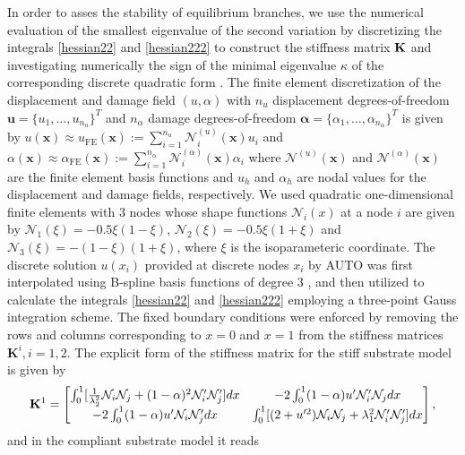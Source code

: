 In order to asses the stability of equilibrium branches, we use  the numerical evaluation of the smallest eigenvalue of the second variation by discretizing the integrals \eqref{hessian22} and   \eqref{hessian222} to construct the stiffness matrix
${\bf K}$ and investigating numerically the sign of the minimal eigenvalue $\kappa$ of the corresponding discrete quadratic form \cite{Sanderson2016-ht}.  The finite element discretization of the displacement and damage field $(u, \alpha )$     with \( n_u \) displacement degrees-of-freedom 
$
\mathbf{u} = \{ u_1, \ldots, u_{n_u} \}^T 
$
and \( n_\alpha \) damage degrees-of-freedom 
$
\boldsymbol{\alpha} = \{ \alpha_1, \ldots, \alpha_{n_\alpha} \}^T
$ is given by 
$
u(\mathbf{x}) \approx u_{\text{FE}} (\mathbf{x}) := \sum_{i=1}^{n_u} \mathcal{N}^{(u)}_i(\mathbf{x}) u_i $
and $\alpha(\mathbf{x}) \approx \alpha_{\text{FE}} (\mathbf{x}) := \sum_{i=1}^{n_\alpha} \mathcal{N}^{(\alpha)}_i (\mathbf{x}) \alpha_i 
$
where $\mathcal{N}^{(u)}(\mathbf{x}) $ and $\mathcal{N}^{(\alpha)}(\mathbf{x}) $ are the finite element basis functions and  $u_h$ and  $\alpha_h$ are nodal values for the displacement and damage fields, respectively. We used quadratic one-dimensional finite elements with 3 nodes  whose   shape functions   ${\mathcal N}_i(x)$ at a node $i$  are given by ${\mathcal N}_1(\xi)=-0.5\xi(1-\xi)$, ${\mathcal N}_2(\xi)=-0.5\xi(1+\xi)$ and ${\mathcal N}_3(\xi)=-(1-\xi)(1+\xi)$, where $\xi$ is the isoparameteric coordinate. The discrete solution $u(x_i)$ provided at discrete nodes $x_i$ by AUTO was first interpolated using B-spline basis functions of degree 3 \cite{Grimstad2016-cq}, and then utilized to calculate the integrals \eqref{hessian22} and   \ref{hessian222} employing a three-point Gauss integration scheme. The fixed boundary conditions were enforced by removing the rows and columns corresponding to $x = 0$ and $x = 1$ from the stiffness matrices $\mathbf{K}^i, i = 1, 2$. The explicit form of the stiffness matrix for the stiff substrate model is given by
\begin{equation}
{\bf K}^1=\begin{bmatrix}
\int_0^1[ \frac{1}{\lambda_2^2}{\mathcal N}_i{\mathcal N}_j + (1-\alpha)^2{\mathcal N}'_i{\mathcal N}'_j
] dx&
-2\int_0^1(1-\alpha)u' {\mathcal N}'_i {\mathcal N}_j  dx\\
-2\int_0^1(1-\alpha)u' {\mathcal N}_i {\mathcal N}'_j dx
& \int_0^1 [ (2+u'^2){\mathcal N}_i{\mathcal N}_j +\lambda_1^2{\mathcal N}'_i{\mathcal N}'_j] dx
\end{bmatrix},
\label{eq:stifness1}
\end{equation}
and in the compliant substrate model it reads

